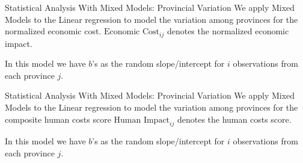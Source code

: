 \begin{frame}{Statistical Analysis With Mixed Models: Provincial Variation}
We apply Mixed Models to the Linear regression to model the variation among provinces for the normalized economic cost. $\text{Economic Cost}_{ij}$ denotes the normalized economic impact.

In this model we have $b$'s as the random slope/intercept for $i$ observations from each province $j$.
\end{frame}

\begin{frame}{Statistical Analysis With Mixed Models: Provincial Variation}
We apply Mixed Models to the Linear regression to model the variation among provinces for the composite human costs score $\text{Human Impact}_{ij}$ denotes the human costs score.

In this model we have $b$'s as the random slope/intercept for $i$ observations from each province $j$.
\end{frame}
